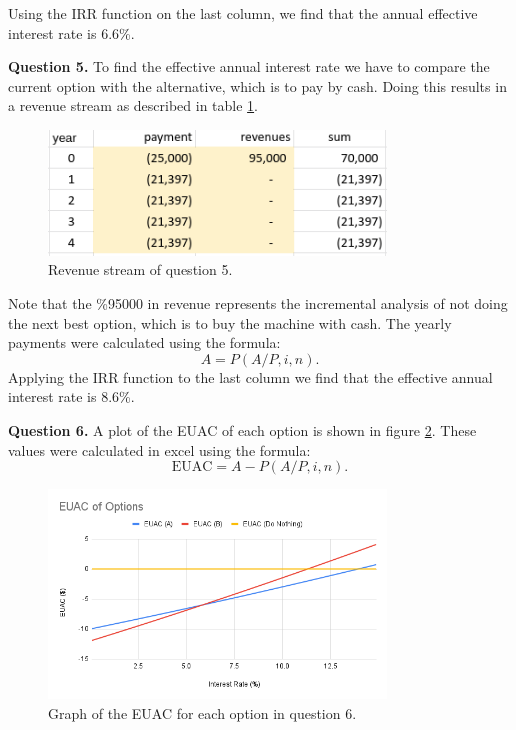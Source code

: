 \documentclass[letterpaper, reqno,11pt]{article}
\begin{document}
Using the IRR function on the last column, we find that the annual effective interest rate is 6.6\%. 


{\noindent\bf Question 5.} To find the effective annual interest rate we have to compare the current option with the alternative, which is to pay by cash. Doing this results in a revenue stream as described in table \ref{fig:q5}. 

\begin{figure}[htpb]
    \centering
    \includegraphics[width=0.8\textwidth]{q5}
    \caption{Revenue stream of question 5. }
    \label{fig:q5}
\end{figure}

Note that the \%95000 in revenue represents the incremental analysis of not doing the next best option, which is to buy the machine with cash. The yearly payments were calculated using the formula: 
 \[
A=P (A /P, i, n)
.\]
Applying the IRR function to the last column we find that the effective annual interest rate is 8.6\%. 

{\noindent\bf Question 6.} A plot of the EUAC of each option is shown in figure \ref{fig:q6}. These values were calculated in excel using the formula: 
\[
\text{EUAC}=A-P(A /P, i, n)
.\]

\begin{figure}[htpb]
    \centering
    \includegraphics[width=0.8\textwidth]{q6.png}
    \caption{Graph of the EUAC for each option in question 6. }
    \label{fig:q6}
\end{figure}
\end{document}
